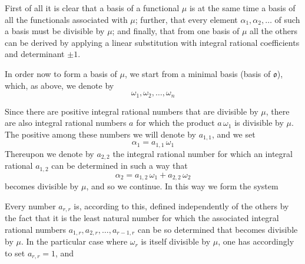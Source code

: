 
First of all it is clear that a basis of a functional $\mu$ is at the
same time a basis of all the functionals associated with $\mu$; further,
that every element $\alpha_1, \alpha_2, \ldots$ of such a basis must be
divisible by $\mu$; and finally, that from one basis of $\mu$ all the
others can be derived by applying a linear substitution with integral
rational coefficients and determinant $\pm 1$.

In order now to form a basis of $\mu$, we start from a minimal basis
(basis of $\mathfrak{o}$), which, as above, we denote by
\[
\omega_1, \omega_2, \ldots, \omega_n
\]

Since there are positive integral rational numbers that are divisible by
$\mu$, there are also integral rational numbers $a$ for which the
product $a\,\omega_1$ is divisible by $\mu$. The  positive among
these numbers we will denote by $a_{1,1}$, and we set
\[
\alpha_1 = a_{1,1}\,\omega_1
\]
Thereupon we denote by $a_{2,2}$ the  integral rational
number for which an integral rational $a_{1,2}$ can be determined in
such a way that
\[
\alpha_2 = a_{1,2}\,\omega_1 + a_{2,2}\,\omega_2
\]
becomes divisible by $\mu$, and so we continue. In this way we form the
system

Every number $a_{r,r}$ is, according to this, defined
independently of the others by the fact that it is the least natural
number for which the associated integral rational numbers
$a_{1,r}, a_{2,r}, \ldots, a_{r-1,r}$ can be so determined that
becomes divisible by $\mu$. In the particular case where
$\omega_r$ is itself divisible by $\mu$, one has accordingly to set
$a_{r,r} = 1$, and

